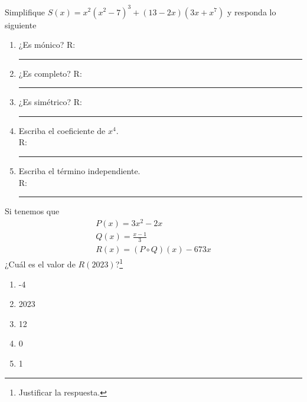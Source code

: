 \begin{exercise}
    Simplifique $S(x) = x^2(x^2 - 7)^3 + (13 - 2x)(3x + x^7)$ y responda lo siguiente

    \begin{multicols}{2}
        \begin{enumerate}
            \item ¿Es mónico? R: \rule{1cm}{0.1mm}
            \item ¿Es completo? R: \rule{1cm}{0.1mm}
            \item ¿Es simétrico? R: \rule{1cm}{0.1mm}
            \item Escriba el coeficiente de $x^4$. \\R: \rule{1cm}{0.1mm}
            \item Escriba el término independiente. \\R: \rule{1cm}{0.1mm}
        \end{enumerate}
    \end{multicols}
\end{exercise}

\begin{exercise}
    Si tenemos que
    \vspace{-5mm}
    \begin{align*}
        P(x) = 3x^2 - 2x \\
        Q(x) = \frac{x - 1}{3} \\
        R(x) = (P \circ Q)(x) - 673x
    \end{align*}
    ¿Cuál es el valor de $R(2023)$?\footnote{Justificar la respuesta.}
    \begin{multicols}{5}
        \begin{enumerate}
            \item -4
            \item 2023
            \item 12
            \item 0
            \item 1
        \end{enumerate}
    \end{multicols}
\end{exercise}